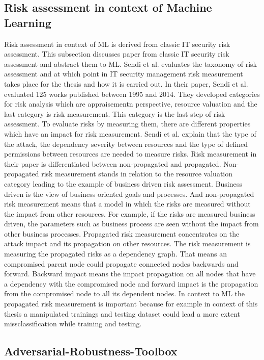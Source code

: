 \subsection{Risk assessment in context of Machine Learning}

Risk assessment in context of ML is derived from classic IT security risk assessment. This subsection discusses paper from classic IT security risk assessment and abstract them to ML. Sendi et al. \cite{DBLP:journals/compsec/SendiAC16} evaluates the taxonomy of risk assessment and at which point in IT security management risk measurement takes place for the thesis and how it is carried out. In their paper, Sendi et al. evaluated 125 works published between 1995 and 2014. They developed categories for risk analysis which are appraisementn perspective, resource valuation and the last category is risk measurement. This category is the last step of risk assessment. To evaluate risks by measuring them, there are different properties which have an impact for risk measurement. Sendi et al. explain that the type of the attack, the dependency severity between resources and the type of defined permissions between resources are needed to measure risks. Risk measurement in their paper is differentiated between non-propagated and propagated. Non-propagated risk measurement stands in relation to the resource valuation category leading to the example of business driven risk assessment. Business driven is the view of business oriented goals and processes. And non-propagated risk measurement means that a model in which the risks are measured without the impact from other resources. For example, if the risks are measured business driven, the parameters such as business process are seen without the impact from other business processes. Propagated risk measurement concentrates on the attack impact and its propagation on other resources. The risk measurement is measuring the propagated risks as a dependency graph. That means an compromised parent node could propagate connected nodes backwards and forward. Backward impact means the impact propagation on all nodes that have a dependency with the compromised node and forward impact is the propagation from the compromised node to all its dependent nodes. In context to ML the propagated risk measurement is important because for example in context of this thesis a manipulated trainings and testing dataset could lead a more extent missclassification while training and testing.

\subsection{Adversarial-Robustness-Toolbox}

